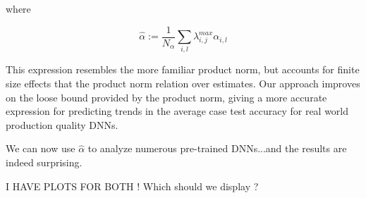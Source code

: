 where

$$\hat{\alpha}:=\dfrac{1}{N_{\alpha}}\sum_{i,l}\lambda^{max}_{i,j}\alpha_{i,l}$$

This expression resembles the more familiar product norm, but accounts for finite size effects that the product norm relation over estimates.
Our approach improves on the loose bound provided by the product norm, giving a more accurate expression for predicting trends
in the average case test accuracy for real world production quality DNNs.

We can now use $\hat{\alpha}$ to analyze numerous pre-trained DNNs...and the results are indeed surprising.

I HAVE PLOTS FOR BOTH !
Which should we display ?  

